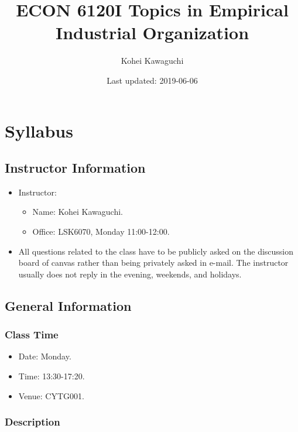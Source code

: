 \documentclass[]{book}
\title{ECON 6120I Topics in Empirical Industrial Organization}
\author{Kohei Kawaguchi}
\date{Last updated: 2019-06-06}
\providecommand{\tightlist}{%
  \setlength{\itemsep}{0pt}\setlength{\parskip}{0pt}}
\begin{document}
\maketitle

{
\setcounter{tocdepth}{1}
\tableofcontents
}
\chapter{Syllabus}\label{syllabus}

\section{Instructor Information}\label{instructor-information}

\begin{itemize}
\tightlist
\item
  Instructor:

  \begin{itemize}
  \tightlist
  \item
    Name: Kohei Kawaguchi.
  \item
    Office: LSK6070, Monday 11:00-12:00.
  \end{itemize}
\item
  All questions related to the class have to be publicly asked on the
  discussion board of canvas rather than being privately asked in
  e-mail. The instructor usually does not reply in the evening,
  weekends, and holidays.
\end{itemize}

\section{General Information}\label{general-information}

\subsection{Class Time}\label{class-time}

\begin{itemize}
\tightlist
\item
  Date: Monday.
\item
  Time: 13:30-17:20.
\item
  Venue: CYTG001.
\end{itemize}

\subsection{Description}\label{description}
\end{document}
